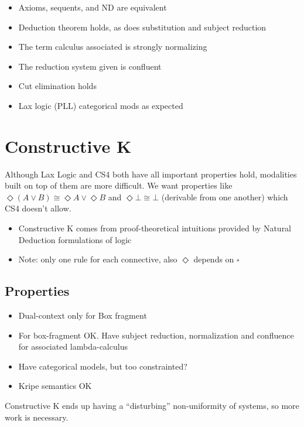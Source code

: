 \documentclass[11pt]{article}
\begin{document}
\begin{itemize}
    \item Axioms, sequents, and ND are equivalent 
    \item Deduction theorem holds, as does substitution and subject reduction
    \item The term calculus associated is strongly normalizing
    \item The reduction system given is confluent 
    \item Cut elimination holds
    \item Lax logic (PLL) categorical mods as expected
\end{itemize}


\section{Constructive K}
Although Lax Logic and CS4 both have all important properties hold, modalities built on top of them are more difficult. We want properties like $\Diamond(A\lor B) \cong \Diamond A \lor \Diamond B$ and $\Diamond \bot \cong \bot$ (derivable from one another) which CS4 doesn't allow.

\begin{itemize}
    \item Constructive K comes from proof-theoretical intuitions provided by Natural Deduction formulations of logic
    \item Note: only one rule for each connective, also $\Diamond$ depends on $\square$
\end{itemize}

\subsection{Properties}

\begin{itemize}
    \item Dual-context only for Box fragment
    \item For box-fragment OK. Have subject reduction, normalization and confluence for associated lambda-calculus
    \item Have categorical models, but too constrainted?
    \item Kripe semantics OK
\end{itemize}
Constructive K ends up having a ``disturbing'' non-uniformity of systems, so more work is necessary.
\end{document}
